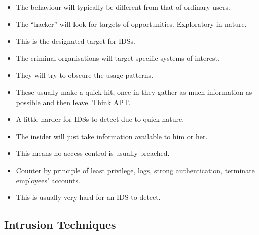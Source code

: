 \documentclass{beamer}
\begin{document}
\begin{frame}{\insertsubsectionhead}
  \begin{itemize}
    \item The behaviour will typically be different from that of ordinary 
      users.

    \item The ``hacker'' will look for targets of opportunities.
      Exploratory in nature.

    \item This is the designated target for IDSs.
  \end{itemize}
\end{frame}

\begin{frame}{\insertsubsectionhead}
  \begin{itemize}
    \item The criminal organisations will target specific systems of interest.

    \item They will try to obscure the usage patterns.

    \item These usually make a quick hit, once in they gather as much 
      information as possible and then leave.
      Think APT.

    \item A little harder for IDSs to detect due to quick nature.
  \end{itemize}
\end{frame}

\begin{frame}{\insertsubsectionhead}
  \begin{itemize}
    \item The insider will just take information available to him or her.

    \item This means no access control is usually breached.

    \item Counter by principle of least privilege, logs, strong authentication, 
      terminate employees' accounts.

    \item This is usually very hard for an IDS to detect.
  \end{itemize}
\end{frame}

\subsection{Intrusion Techniques}
\end{document}
